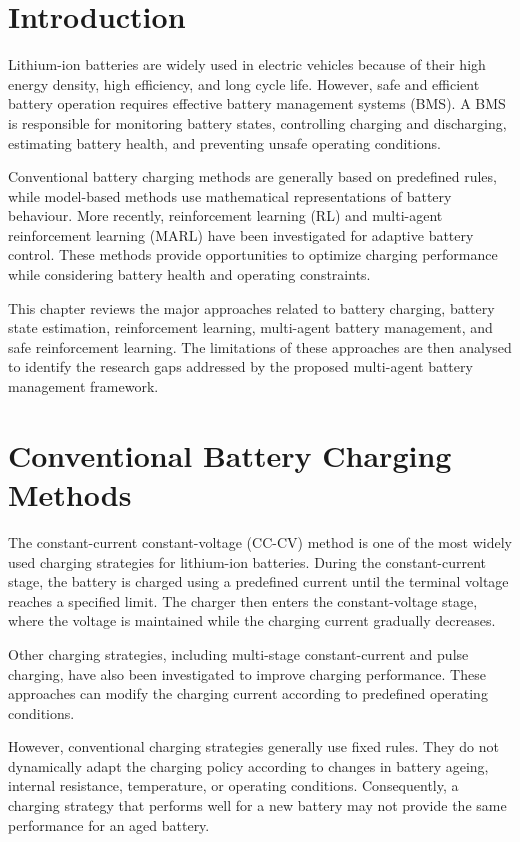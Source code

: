\label{chap.2}
\label{chap:literature}

\section{Introduction}

Lithium-ion batteries are widely used in electric vehicles because of
their high energy density, high efficiency, and long cycle life.
However, safe and efficient battery operation requires effective
battery management systems (BMS). A BMS is responsible for monitoring
battery states, controlling charging and discharging, estimating
battery health, and preventing unsafe operating conditions.

Conventional battery charging methods are generally based on predefined
rules, while model-based methods use mathematical representations of
battery behaviour. More recently, reinforcement learning (RL) and
multi-agent reinforcement learning (MARL) have been investigated for
adaptive battery control. These methods provide opportunities to
optimize charging performance while considering battery health and
operating constraints.

This chapter reviews the major approaches related to battery charging,
battery state estimation, reinforcement learning, multi-agent battery
management, and safe reinforcement learning. The limitations of these
approaches are then analysed to identify the research gaps addressed by
the proposed multi-agent battery management framework.

\section{Conventional Battery Charging Methods}

The constant-current constant-voltage (CC-CV) method is one of the
most widely used charging strategies for lithium-ion batteries. During
the constant-current stage, the battery is charged using a predefined
current until the terminal voltage reaches a specified limit. The
charger then enters the constant-voltage stage, where the voltage is
maintained while the charging current gradually decreases.

Other charging strategies, including multi-stage constant-current and
pulse charging, have also been investigated to improve charging
performance. These approaches can modify the charging current according
to predefined operating conditions.

However, conventional charging strategies generally use fixed rules.
They do not dynamically adapt the charging policy according to changes
in battery ageing, internal resistance, temperature, or operating
conditions. Consequently, a charging strategy that performs well for a
new battery may not provide the same performance for an aged battery.


